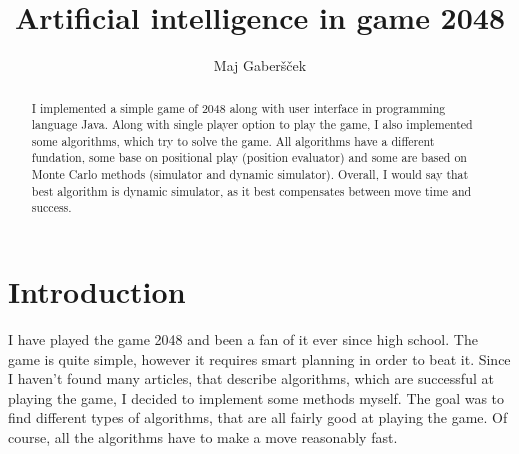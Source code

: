\documentclass[sigconf,nonacm]{acmart}
\begin{document}
\title{Artificial intelligence in game 2048}


\author{Maj Gaber\v{s}\v{c}ek}


\begin{abstract}
    I implemented a simple game of 2048 along with user interface in programming language Java. Along with single player option to play the game, I also implemented some algorithms, which try to solve the game. All algorithms have a different fundation, some base on positional play (position evaluator) and some are based on Monte Carlo methods (simulator and dynamic simulator). Overall, I would say that best algorithm is dynamic simulator, as it best compensates between move time and success. 
\end{abstract}


\maketitle

\section{Introduction}

I have played the game 2048 and been a fan of it ever since high school. The game is quite simple, however it requires smart planning in order to beat it. Since I haven't found many articles, that describe algorithms, which are successful at playing the game, I decided to implement some methods myself. The goal was to find different types of algorithms, that are all fairly good at playing the game. Of course, all the algorithms have to make a move reasonably fast.
\end{document}
